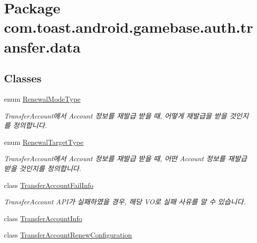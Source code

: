 \hypertarget{namespacecom_1_1toast_1_1android_1_1gamebase_1_1auth_1_1transfer_1_1data}{}\section{Package com.\+toast.\+android.\+gamebase.\+auth.\+transfer.\+data}
\label{namespacecom_1_1toast_1_1android_1_1gamebase_1_1auth_1_1transfer_1_1data}
\subsection*{Classes}
\begin{DoxyCompactItemize}
\item 
enum \hyperlink{enumcom_1_1toast_1_1android_1_1gamebase_1_1auth_1_1transfer_1_1data_1_1_renewal_mode_type}{Renewal\+Mode\+Type}
\begin{DoxyCompactList}\small\item\em Transfer\+Account에서 Account 정보를 재발급 받을 때, 어떻게 재발급을 받을 것인지를 정의합니다. \end{DoxyCompactList}\item 
enum \hyperlink{enumcom_1_1toast_1_1android_1_1gamebase_1_1auth_1_1transfer_1_1data_1_1_renewal_target_type}{Renewal\+Target\+Type}
\begin{DoxyCompactList}\small\item\em Transfer\+Account에서 Account 정보를 재발급 받을 때, 어떤 Account 정보를 재발급 받을 것인지를 정의합니다. \end{DoxyCompactList}\item 
class \hyperlink{classcom_1_1toast_1_1android_1_1gamebase_1_1auth_1_1transfer_1_1data_1_1_transfer_account_fail_info}{Transfer\+Account\+Fail\+Info}
\begin{DoxyCompactList}\small\item\em Transfer\+Account A\+P\+I가 실패하였을 경우, 해당 V\+O로 실패 사유를 알 수 있습니다. \end{DoxyCompactList}\item 
class \hyperlink{classcom_1_1toast_1_1android_1_1gamebase_1_1auth_1_1transfer_1_1data_1_1_transfer_account_info}{Transfer\+Account\+Info}
\item 
class \hyperlink{classcom_1_1toast_1_1android_1_1gamebase_1_1auth_1_1transfer_1_1data_1_1_transfer_account_renew_configuration}{Transfer\+Account\+Renew\+Configuration}
\end{DoxyCompactItemize}
